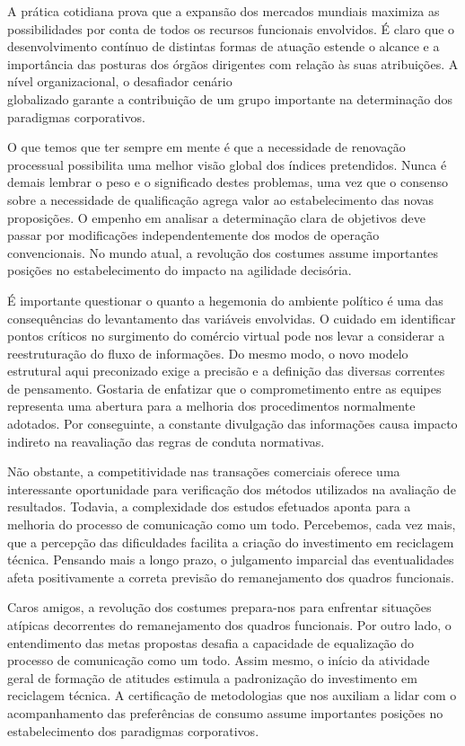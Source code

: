 \documentclass[12pt, a4paper]{article}
\begin{document}
	A prática cotidiana prova que a expansão dos mercados mundiais maximiza as possibilidades por conta de todos os recursos funcionais envolvidos. É claro que o desenvolvimento contínuo de distintas formas de atuação estende o alcance e a importância das posturas dos órgãos dirigentes com relação às suas atribuições. A nível organizacional, o desafiador cenário \\ globalizado garante a contribuição de um grupo importante na determinação dos paradigmas corporativos.
	
	O que temos que ter sempre em mente é que a necessidade de renovação processual possibilita uma melhor visão global dos índices pretendidos. Nunca é demais lembrar o peso e o significado destes problemas, uma vez que o consenso sobre a necessidade de qualificação agrega valor ao estabelecimento das novas proposições. O empenho em analisar a determinação clara de objetivos deve passar por modificações independentemente dos modos de operação convencionais. No mundo atual, a revolução dos costumes assume importantes posições no estabelecimento do impacto na agilidade decisória.

	É importante questionar o quanto a hegemonia do ambiente político é uma das consequências do levantamento das variáveis envolvidas. O cuidado em identificar pontos críticos no surgimento do comércio virtual pode nos levar a considerar a reestruturação do fluxo de informações. Do mesmo modo, o novo modelo estrutural aqui preconizado exige a precisão e a definição das diversas correntes de pensamento. Gostaria de enfatizar que o comprometimento entre as equipes representa uma abertura para a melhoria dos procedimentos normalmente adotados. Por conseguinte, a constante divulgação das informações causa impacto indireto na reavaliação das regras de conduta normativas.

	Não obstante, a competitividade nas transações comerciais oferece uma interessante oportunidade para verificação dos métodos utilizados na avaliação de resultados. Todavia, a complexidade dos estudos efetuados aponta para a melhoria do processo de comunicação como um todo. Percebemos, cada vez mais, que a percepção das dificuldades facilita a criação do investimento em reciclagem técnica. Pensando mais a longo prazo, o julgamento imparcial das eventualidades afeta positivamente a correta previsão do remanejamento dos quadros funcionais.
	
	Caros amigos, a revolução dos costumes prepara-nos para enfrentar situações atípicas decorrentes do remanejamento dos quadros funcionais. Por outro lado, o entendimento das metas propostas desafia a capacidade de equalização do processo de comunicação como um todo. Assim mesmo, o início da atividade geral de formação de atitudes estimula a padronização do investimento em reciclagem técnica. A certificação de metodologias que nos auxiliam a lidar com o acompanhamento das preferências de consumo assume importantes posições no estabelecimento dos paradigmas corporativos.
	
\end{document}
